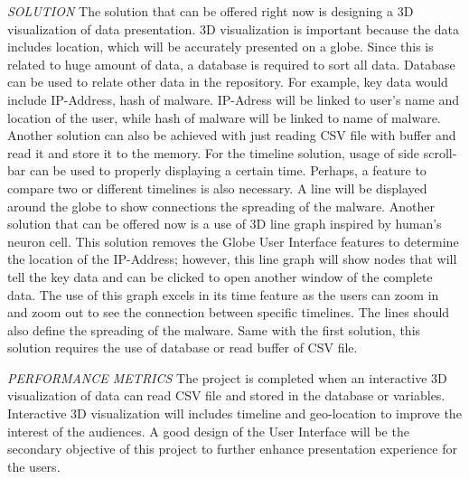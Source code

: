 \documentclass[letter, 10pt, titlepage, onecolumn, draftclsnofoot]{IEEEtran}
\begin{document}
\emph{SOLUTION}
\newline
The solution that can be offered right now is designing a 3D visualization of data presentation. 3D visualization is important because the data includes location, which will be accurately presented on a globe. Since this is related to huge amount of data, a database is required to sort all data. Database can be used to relate other data in the repository. For example, key data would include IP-Address, hash of malware. IP-Adress will be linked to user's name and location of the user, while hash of malware will be linked to name of malware. Another solution can also be achieved with just reading CSV file with buffer and read it and store it to the memory. For the timeline solution, usage of side scroll-bar can be used to properly displaying a certain time. Perhaps, a feature to compare two or different timelines is also necessary. A line will be displayed around the globe to show connections the spreading of the malware.
\newline
Another solution that can be offered now is a use of 3D line graph inspired by human's neuron cell. This solution removes the Globe User Interface features to determine the location of the IP-Address; however, this line graph will show nodes that will tell the key data and can be clicked to open another window of the complete data. The use of this graph excels in its time feature as the users can zoom in and zoom out to see the connection between specific timelines. The lines should also define the spreading of the malware. Same with the first solution, this solution requires the use of database or read buffer of CSV file.

\emph{PERFORMANCE METRICS}
\newline
The project is completed when an interactive 3D visualization of data can read CSV file and stored in the database or variables. Interactive 3D visualization will includes timeline and geo-location to improve the interest of the audiences. A good design of the User Interface will be the secondary objective of this project to further enhance presentation experience for the users.


\nocite{*}

\end{document}
